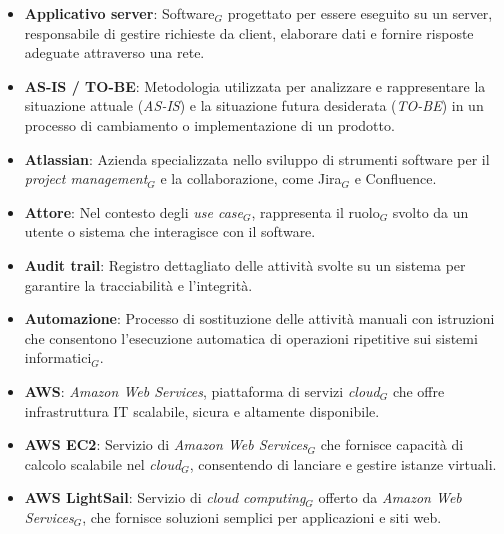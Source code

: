 \begin{itemize}
    \item \textbf{Applicativo server}: Software$_G$ progettato per essere eseguito su un server, responsabile di gestire richieste da client, elaborare dati e fornire risposte adeguate attraverso una rete.
    \item \textbf{AS-IS / TO-BE}: Metodologia utilizzata per analizzare e rappresentare la situazione attuale (\textit{AS-IS}) e la situazione futura desiderata (\textit{TO-BE}) in un processo di cambiamento o implementazione di un prodotto.
    \item \textbf{Atlassian}: Azienda specializzata nello sviluppo di strumenti software per il \textit{project management}$_G$ e la collaborazione, come Jira$_G$ e Confluence.
    \item \textbf{Attore}: Nel contesto degli \textit{use case}$_G$, rappresenta il ruolo$_G$ svolto da un utente o sistema che interagisce con il software.
    \item \textbf{Audit trail}: Registro dettagliato delle attività svolte su un sistema per garantire la tracciabilità e l’integrità.
    \item \textbf{Automazione}: Processo di sostituzione delle attività manuali con istruzioni che consentono l'esecuzione automatica di operazioni ripetitive sui sistemi informatici$_G$.
    \item \textbf{AWS}: \textit{Amazon Web Services}, piattaforma di servizi \textit{cloud}$_G$ che offre infrastruttura IT scalabile, sicura e altamente disponibile.
    \item \textbf{AWS EC2}: Servizio di \textit{Amazon Web Services}$_G$ che fornisce capacità di calcolo scalabile nel \textit{cloud}$_G$, consentendo di lanciare e gestire istanze virtuali.
    \item \textbf{AWS LightSail}: Servizio di \textit{cloud computing}$_G$ offerto da \textit{Amazon Web Services}$_G$, che fornisce soluzioni semplici per applicazioni e siti web.
\end{itemize}
